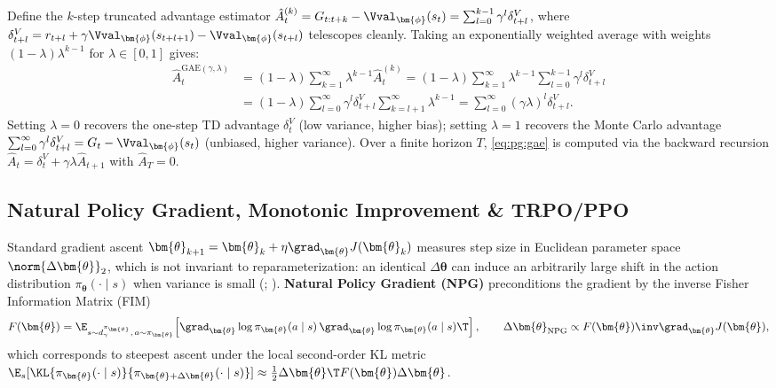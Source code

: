 \documentclass[../../../../master.tex]{subfiles}
\begin{document}
\begin{coremath}
Define the $k$-step truncated advantage estimator $\hat{A}_t^{(k)} = G_{t:t+k} - \Vval_{\bm{\phi}}(s_t) = \sum_{l=0}^{k-1} \gamma^l \delta_{t+l}^V$, where $\delta_{t+l}^V = r_{t+l} + \gamma \Vval_{\bm{\phi}}(s_{t+l+1}) - \Vval_{\bm{\phi}}(s_{t+l})$ telescopes cleanly. Taking an exponentially weighted average with weights $(1 - \lambda)\lambda^{k-1}$ for $\lambda \in [0, 1]$ gives:
\begin{align}
  \hat{A}_t^{\mathrm{GAE}(\gamma, \lambda)} &= (1 - \lambda) \sum_{k=1}^\infty \lambda^{k-1} \hat{A}_t^{(k)}
  = (1 - \lambda) \sum_{k=1}^\infty \lambda^{k-1} \sum_{l=0}^{k-1} \gamma^l \delta_{t+l}^V \nonumber \\
  &= (1 - \lambda) \sum_{l=0}^\infty \gamma^l \delta_{t+l}^V \sum_{k=l+1}^\infty \lambda^{k-1}
  = \sum_{l=0}^\infty (\gamma \lambda)^l \delta_{t+l}^V. \label{eq:pg:gae}
\end{align}
Setting $\lambda = 0$ recovers the one-step TD advantage $\delta_t^V$ (low variance, higher bias); setting $\lambda = 1$ recovers the Monte Carlo advantage $\sum_{l=0}^\infty \gamma^l \delta_{t+l}^V = G_t - \Vval_{\bm{\phi}}(s_t)$ (unbiased, higher variance). Over a finite horizon $T$, \eqref{eq:pg:gae} is computed via the backward recursion $\hat{A}_t = \delta_t^V + \gamma \lambda \hat{A}_{t+1}$ with $\hat{A}_T = 0$.
\end{coremath}

\subsection{Natural Policy Gradient, Monotonic Improvement \& TRPO/PPO}

Standard gradient ascent $\bm{\theta}_{k+1} = \bm{\theta}_k + \eta \grad_{\bm{\theta}} J(\bm{\theta}_k)$ measures step size in Euclidean parameter space $\norm{\Delta \bm{\theta}}_2$, which is not invariant to reparameterization: an identical $\Delta \bm{\theta}$ can induce an arbitrarily large shift in the action distribution $\pi_{\bm{\theta}}(\cdot \mid s)$ when variance is small (; \allowbreak{}). \textbf{Natural Policy Gradient (NPG)} preconditions the gradient by the inverse Fisher Information Matrix (FIM)
\begin{equation}\label{eq:pg:fim}
  F(\bm{\theta}) = \E_{s \sim d^{\pi_{\bm{\theta}}}_\gamma,\, a \sim \pi_{\bm{\theta}}}\!\left[ \grad_{\bm{\theta}} \log \pi_{\bm{\theta}}(a \mid s)\, \grad_{\bm{\theta}} \log \pi_{\bm{\theta}}(a \mid s)\T \right],
  \qquad
  \Delta \bm{\theta}_{\mathrm{NPG}} \propto F(\bm{\theta})\inv \grad_{\bm{\theta}} J(\bm{\theta}),
\end{equation}
which corresponds to steepest ascent under the local second-order KL metric
$\E_s[\KL{\pi_{\bm{\theta}}(\cdot \mid s)}{\pi_{\bm{\theta}+\Delta\bm{\theta}}(\cdot \mid s)}]
\approx \frac{1}{2}\Delta\bm{\theta}\T F(\bm{\theta})\Delta\bm{\theta}$.
\end{document}
